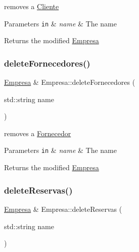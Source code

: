 removes a \hyperlink{classCliente}{Cliente} 


\begin{DoxyParams}[1]{Parameters}
\mbox{\tt in}  & {\em name} & The name\\
\hline
\end{DoxyParams}
\begin{DoxyReturn}{Returns}
the modified \hyperlink{classEmpresa}{Empresa} 
\end{DoxyReturn}
\mbox{\label{classEmpresa_ab8b7dda77caceec58e464c16b7e45f7c}} 
\subsubsection{\texorpdfstring{delete\+Fornecedores()}{deleteFornecedores()}}
{\footnotesize\ttfamily \hyperlink{classEmpresa}{Empresa} \& Empresa\+::delete\+Fornecedores (\begin{DoxyParamCaption}\item[{std\+::string}]{name }\end{DoxyParamCaption})}



removes a \hyperlink{classFornecedor}{Fornecedor} 


\begin{DoxyParams}[1]{Parameters}
\mbox{\tt in}  & {\em name} & The name\\
\hline
\end{DoxyParams}
\begin{DoxyReturn}{Returns}
the modified \hyperlink{classEmpresa}{Empresa} 
\end{DoxyReturn}
\mbox{\label{classEmpresa_a079c008b006f56faac3c1016fe770e8c}} 
\subsubsection{\texorpdfstring{delete\+Reservas()}{deleteReservas()}}
{\footnotesize\ttfamily \hyperlink{classEmpresa}{Empresa} \& Empresa\+::delete\+Reservas (\begin{DoxyParamCaption}\item[{std\+::string}]{name }\end{DoxyParamCaption})}



